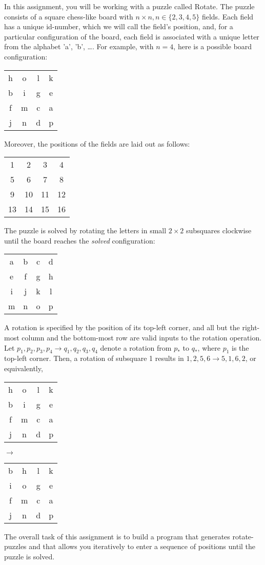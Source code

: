 In this assignment, you will be working with a puzzle called Rotate. The puzzle consists of a square chess-like board with $n\times n, n \in \{2, 3, 4, 5\}$ fields. Each field has a unique id-number, which we will call the field's position, and, for a particular configuration of the board, each field is associated with a unique letter from the alphabet 'a', 'b', \dots. For example, with $n=4$, here is a possible board configuration:
\begin{center}
  \begin{tabular}{cccc}
     h &o &l &k
     \\b &i &g &e
     \\f &m &c &a
     \\j &n &d &p
  \end{tabular}
\end{center}
Moreover, the positions of the fields are laid out as follows:
\begin{center}
  \begin{tabular}{cccc}
    1  &2  &3  &4
    \\ 5  &6  &7  &8
    \\ 9 &10 &11 &12
    \\13 &14 &15 &16
  \end{tabular}
\end{center}
The puzzle is solved by rotating the letters in small $2\times 2$ subsquares clockwise until the board reaches the \emph{solved} configuration:
\begin{center}
  \begin{tabular}{cccc}
    a &b &c &d
    \\ e &f &g &h
    \\ i &j &k &l
    \\ m &n &o &p
  \end{tabular}
\end{center}
A rotation is specified by the position of its top-left corner, and all but the right-most column and the bottom-most row are valid inputs to the rotation operation. Let $p_1, p_2, p_3, p_4 \rightarrow q_1, q_2, q_3, q_4$ denote a rotation from $p_*$ to $q_*$, where $p_1$ is the top-left corner. Then, a rotation of subsquare 1 results in $1, 2, 5, 6\rightarrow 5, 1, 6, 2$, or equivalently,
\begin{center}
  \begin{tabular}{cccc}
     h &o &l &k
     \\b &i &g &e
     \\f &m &c &a
     \\j &n &d &p
  \end{tabular}
  $\rightarrow$
  \begin{tabular}{cccc}
     b &h &l &k
     \\i &o &g &e
     \\f &m &c &a
     \\j &n &d &p
  \end{tabular}
\end{center}
The overall task of this assignment is to build a program that generates rotate-puzzles and that allows you iteratively to enter a sequence of positions until the puzzle is solved.

